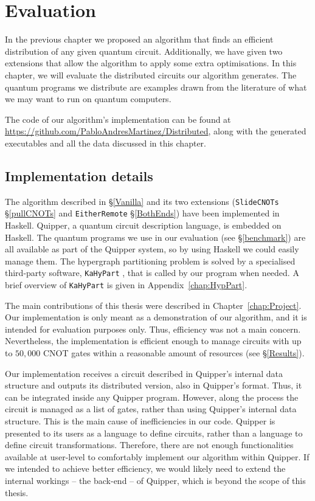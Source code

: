 \chapter{Evaluation}

In the previous chapter we proposed an algorithm that finds an efficient distribution of any given quantum circuit. Additionally, we have given two extensions that allow the algorithm to apply some extra optimisations. In this chapter, we will evaluate the distributed circuits our algorithm generates. The quantum programs we distribute are examples drawn from the literature of what we may want to run on quantum computers.

The code of our algorithm's implementation can be found at {\small \url{https://github.com/PabloAndresMartinez/Distributed}}, along with the generated executables and all the data discussed in this chapter. 


\section{Implementation details}
\label{implementation}

The algorithm described in \S\ref{Vanilla} and its two extensions (\texttt{SlideCNOTs} \S\ref{pullCNOTs} and \texttt{EitherRemote} \S\ref{BothEnds}) have been implemented in Haskell. Quipper, a quantum circuit description language, is embedded on Haskell. The quantum programs we use in our evaluation (see \S\ref{benchmark}) are all available as part of the Quipper system, so by using Haskell we could easily manage them. The hypergraph partitioning problem is solved by a specialised third-party software, \texttt{KaHyPart} \citep{KaHyPart}, that is called by our program when needed. A brief overview of \texttt{KaHyPart} is given in Appendix~\ref{chap:HypPart}. 

The main contributions of this thesis were described in Chapter~\ref{chap:Project}. Our implementation is only meant as a demonstration of our algorithm, and it is intended for evaluation purposes only. Thus, efficiency was not a main concern. Nevertheless, the implementation is efficient enough to manage circuits with up to \(50,000\) CNOT gates within a reasonable amount of resources (see \S\ref{Results}).

Our implementation receives a circuit described in Quipper's internal data structure and outputs its distributed version, also in Quipper's format. Thus, it can be integrated inside any Quipper program. However, along the process the circuit is managed as a list of gates, rather than using Quipper's internal data structure. This is the main cause of inefficiencies in our code. Quipper is presented to its users as a language to define circuits, rather than a language to define circuit transformations. Therefore, there are not enough functionalities available at user-level to comfortably implement our algorithm within Quipper. If we intended to achieve better efficiency, we would likely need to extend the internal workings -- the back-end -- of Quipper, which is beyond the scope of this thesis.

